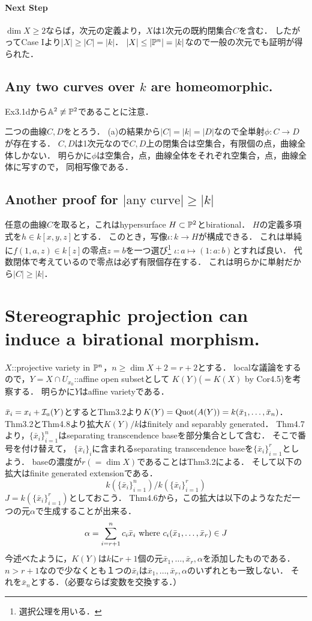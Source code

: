 \documentclass[a4paper]{jsarticle}
\begin{document}
    \paragraph{Next Step}
    $\dim X \geq 2$ならば，次元の定義より，$X$は1次元の既約閉集合$C$を含む．
    したがってCase Iより$|X| \geq |C|=|k|$．
    $|X| \leq |\mathbb{P}^n|=|k|$なので一般の次元でも証明が得られた．

    \subsection{Any two curves over $k$ are homeomorphic.}
    Ex3.1dから$\mathbb{A}^2 \not \equiv \mathbb{P}^2$であることに注意．

    二つの曲線$C,D$をとろう．
    (a)の結果から$|C|=|k|=|D|$なので全単射$\phi:C \to D$が存在する．
    $C,D$は1次元なので$C,D$上の閉集合は空集合，有限個の点，曲線全体しかない．
    明らかに$\phi$は空集合，点，曲線全体をそれぞれ空集合，点，曲線全体に写すので，
    同相写像である．

    \subsection{Another proof for $|\text{any curve}| \geq |k|$}
    任意の曲線$C$を取ると，これはhypersurface $H \subset \mathbb{P}^2$とbirational．
    $H$の定義多項式を$h \in k[x,y,z]$とする．
    このとき，写像$\iota: k \to H$が構成できる．
    これは単純に$f(1,a,z) \in k[z]$の零点$z=b$を一つ選び\footnote{選択公理を用いる．}
    $\iota: a \mapsto (1:a:b)$とすれば良い．
    代数閉体で考えているので零点は必ず有限個存在する．
    これは明らかに単射だから$|C| \geq |k|$．

\section{Stereographic projection can induce a birational morphism.} %
    $X$::projective variety in $\mathbb{P}^n$，$n \geq \dim X+2=r+2$とする．
    localな議論をするので，$Y=X \cap U_{x_0}$::affine open subsetとして
    $K(Y)$($=K(X)$ by Cor4.5)を考察する．
    明らかに$Y$はaffine varietyである．

    $\bar{x}_i=x_i+\mathcal{I}_a(Y)$とするとThm3.2より$K(Y)=\operatorname{Quot}(A(Y))=k(\bar{x}_1,\dots,\bar{x}_n)$．
    Thm3.2とThm4.8より拡大$K(Y)/k$はfinitely and separably generated．
    Thm4.7より，$\{\bar{x}_i\}_{i=1}^n$はseparating transcendence baseを部分集合として含む．
    そこで番号を付け替えて，
    $\{\bar{x}_i\}_i$に含まれるseparating transcendence baseを$\{\bar{x}_i\}_{i=1}^{r}$としよう．
    baseの濃度が$r(=\dim X)$であることはThm3.2による．
    そして以下の拡大はfinite generated extensionである．
    \[ k(\{\bar{x}_i\}_{i=1}^{n})/k(\{\bar{x}_i\}_{i=1}^{r}) \]
    $J=k(\{\bar{x}_i\}_{i=1}^{r})$としておこう．
    Thm4.6から，この拡大は以下のようなただ一つの元$\alpha$で生成することが出来る．
    \[ \alpha=\sum_{i=r+1}^{n}{c_i \bar{x}_i} \text{ where } c_i(\bar{x}_1,\dots,\bar{x}_r) \in J \]
    今述べたように，$K(Y)$は$k$に$r+1$個の元$\bar{x}_1, \dots, \bar{x}_r, \alpha$を添加したものである．
    $n>r+1$なので少なくとも１つの$\bar{x}_i$は$\bar{x}_1, \dots, \bar{x}_r, \alpha$のいずれとも一致しない．
    それを$\bar{x}_n$とする．（必要ならば変数を交換する．）
\end{document}
